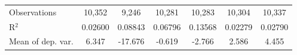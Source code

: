 \begin{tabular}{lcccccc}
   Observations                                                          & 10,352                    & 9,246          & 10,281         & 10,283         & 10,304        & 10,337\\  
   R$^2$                                                                 & 0.02600                   & 0.08843        & 0.06796        & 0.13568        & 0.02279       & 0.02790\\  
   Mean of dep. var.                                                     & 6.347                     & -17.676        & -0.619         & -2.766         & 2.586         & 4.455\\  
\bottomrule
\end{tabular}
